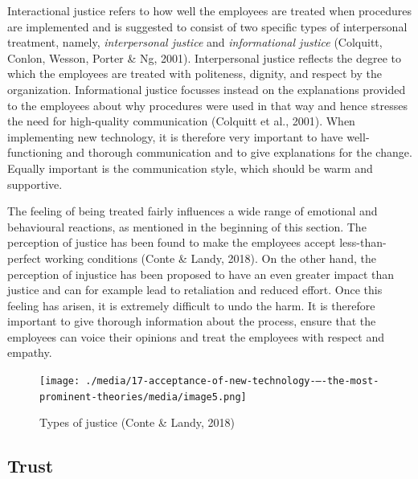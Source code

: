 \documentclass[
  12pt,
]{scrbook}
\begin{document}
Interactional justice refers to how well the employees are treated when procedures are implemented and is suggested to consist of two specific types of interpersonal treatment, namely, \emph{interpersonal justice} and \emph{informational justice} (Colquitt, Conlon, Wesson, Porter \& Ng, 2001). Interpersonal justice reflects the degree to which the employees are treated with politeness, dignity, and respect by the organization. Informational justice focusses instead on the explanations provided to the employees about why procedures were used in that way and hence stresses the need for high-quality communication (Colquitt et al., 2001). When implementing new technology, it is therefore very important to have well-functioning and thorough communication and to give explanations for the change. Equally important is the communication style, which should be warm and supportive.

The feeling of being treated fairly influences a wide range of emotional and behavioural reactions, as mentioned in the beginning of this section. The perception of justice has been found to make the employees accept less-than-perfect working conditions (Conte \& Landy, 2018). On the other hand, the perception of injustice has been proposed to have an even greater impact than justice and can for example lead to retaliation and reduced effort. Once this feeling has arisen, it is extremely difficult to undo the harm. It is therefore important to give thorough information about the process, ensure that the employees can voice their opinions and treat the employees with respect and empathy.

\begin{figure}
\hypertarget{fig:figure165}{%
\centering
\texttt{[image: ./media/17-acceptance-of-new-technology-–-the-most-prominent-theories/media/image5.png]}
\caption[Types of justice (Conte \& Landy, 2018)]{Types of justice (Conte \& Landy, 2018)\footnotemark{}}\label{fig:figure165}
}
\end{figure}

\hypertarget{trust}{%
\subsection*{Trust}\label{trust}}
\end{document}
